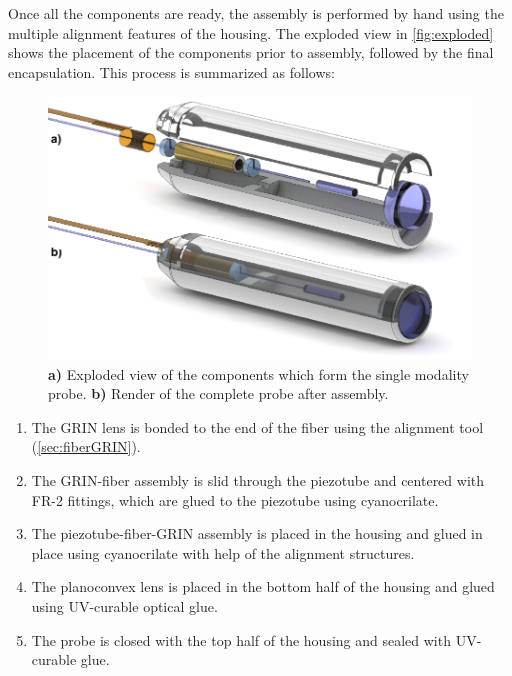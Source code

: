 Once all the components are ready, the assembly is performed by hand using the multiple alignment features of the housing. The exploded view in \autoref{fig:exploded} shows the placement of the components prior to assembly, followed by the final encapsulation. This process is summarized as follows:

\begin{figure}[h!]\centering \includegraphics{figures/40_Fabrication/Assy/explodedRender/explodedRender.pdf}
      \caption{\textbf{a)} Exploded view of the components which form the single modality probe.
      \textbf{b)} Render of the complete probe after assembly.}
      \label{fig:exploded}
\end{figure}

\begin{enumerate}
\item The GRIN lens is bonded to the end of the fiber using the alignment tool (\autoref{sec:fiberGRIN}).
\item The GRIN-fiber assembly is slid through the piezotube and centered with FR-2 fittings, which are glued to the piezotube using cyanocrilate.
\item The piezotube-fiber-GRIN assembly is placed in the housing and glued in place using cyanocrilate with help of the alignment structures.
\item The planoconvex lens is placed in the bottom half of the housing and glued using UV-curable optical glue.
\item The probe is closed with the top half of the housing and sealed with UV-curable glue.
\end{enumerate}

